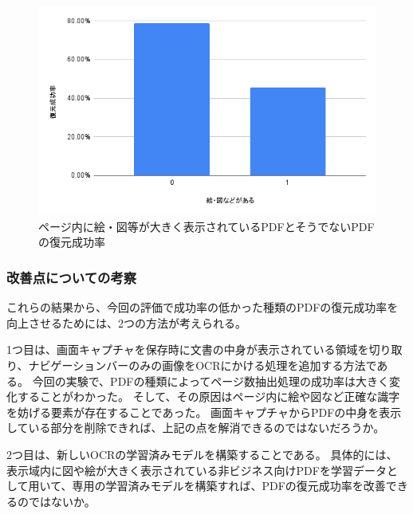\begin{figure}[htbp]
  \caption{ページ内に絵・図等が大きく表示されているPDFとそうでないPDFの復元成功率}
  \label{fig:success-rate-figure-or-not-pdf}
  \begin{center}
    \includegraphics[bb=0 0 600 371,width=15cm]{img/060_evaluation/consideration/pdf/success-rate-figure-or-not-pdf.pdf}
  \end{center}
\end{figure}

\subsubsection{改善点についての考察}
これらの結果から、今回の評価で成功率の低かった種類のPDFの復元成功率を向上させるためには、2つの方法が考えられる。

1つ目は、画面キャプチャを保存時に文書の中身が表示されている領域を切り取り、ナビゲーションバーのみの画像をOCRにかける処理を追加する方法である。
今回の実験で、PDFの種類によってページ数抽出処理の成功率は大きく変化することがわかった。
そして、その原因はページ内に絵や図など正確な識字を妨げる要素が存在することであった。
画面キャプチャからPDFの中身を表示している部分を削除できれば、上記の点を解消できるのではないだろうか。

2つ目は、新しいOCRの学習済みモデルを構築することである。
具体的には、表示域内に図や絵が大きく表示されている非ビジネス向けPDFを学習データとして用いて、専用の学習済みモデルを構築すれば、PDFの復元成功率を改善できるのではないか。
